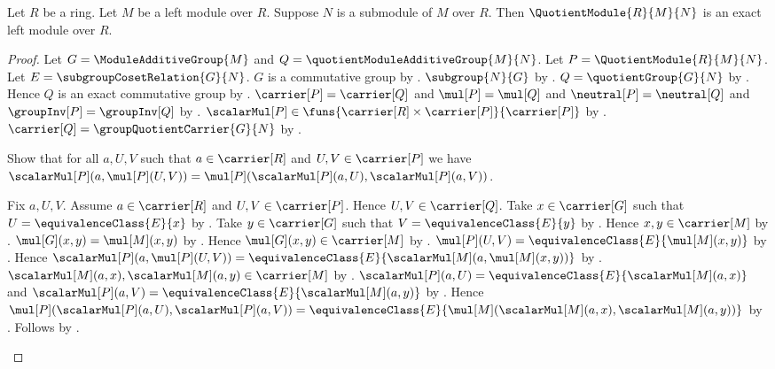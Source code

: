 \begin{theorem}\label{quotient_module_is_exact}
    Let $R$ be a ring.
    Let $M$ be a left module over $R$.
    Suppose $N$ is a submodule of $M$ over $R$.
    Then $\QuotientModule{R}{M}{N}$ is an exact left module over $R$.
\end{theorem}
\begin{proof}
    Let $G=\ModuleAdditiveGroup{M}$ and
        $Q=\quotientModuleAdditiveGroup{M}{N}$.
    Let $P=\QuotientModule{R}{M}{N}$.
    Let $E=\subgroupCosetRelation{G}{N}$.
    $G$ is a commutative group by
        .
    $\subgroup{N}{G}$ by .
    $Q=\quotientGroup{G}{N}$ by
        .
    Hence $Q$ is an exact commutative group by
        .
    $\carrier[P]=\carrier[Q]$ and $\mul[P]=\mul[Q]$ and
        $\neutral[P]=\neutral[Q]$ and
        $\groupInv[P]=\groupInv[Q]$ by
        .
    $\scalarMul[P]\in
        \funs{\carrier[R]\times\carrier[P]}{\carrier[P]}$ by
        .
    $\carrier[Q]=\groupQuotientCarrier{G}{N}$ by
        .

    Show that for all $a,U,V$ such that $a\in\carrier[R]$ and
        $U,V\in\carrier[P]$ we have
        $\scalarMul[P](a,\mul[P](U,V))
            =\mul[P](\scalarMul[P](a,U),\scalarMul[P](a,V))$.
    \begin{subproof}
        Fix $a,U,V$.
        Assume $a\in\carrier[R]$ and $U,V\in\carrier[P]$.
        Hence $U,V\in\carrier[Q]$.
        Take $x\in\carrier[G]$ such that
            $U=\equivalenceClass{E}{x}$ by
            .
        Take $y\in\carrier[G]$ such that
            $V=\equivalenceClass{E}{y}$ by
            .
        Hence $x,y\in\carrier[M]$ by
            .
        $\mul[G](x,y)=\mul[M](x,y)$ by
            .
        Hence $\mul[G](x,y)\in\carrier[M]$ by
            .
        $\mul[P](U,V)=
            \equivalenceClass{E}{\mul[M](x,y)}$ by
            .
        Hence
            $\scalarMul[P](a,\mul[P](U,V))
                =\equivalenceClass{E}{
                    \scalarMul[M](a,\mul[M](x,y))}$ by
            .
        $\scalarMul[M](a,x),\scalarMul[M](a,y)\in\carrier[M]$ by
            .
        $\scalarMul[P](a,U)=
            \equivalenceClass{E}{\scalarMul[M](a,x)}$ and
            $\scalarMul[P](a,V)=
            \equivalenceClass{E}{\scalarMul[M](a,y)}$ by
            .
        Hence
            $\mul[P](\scalarMul[P](a,U),\scalarMul[P](a,V))
                =\equivalenceClass{E}{
                    \mul[M](\scalarMul[M](a,x),
                        \scalarMul[M](a,y))}$ by
            .
        Follows by .
    \end{subproof}


\end{proof}
